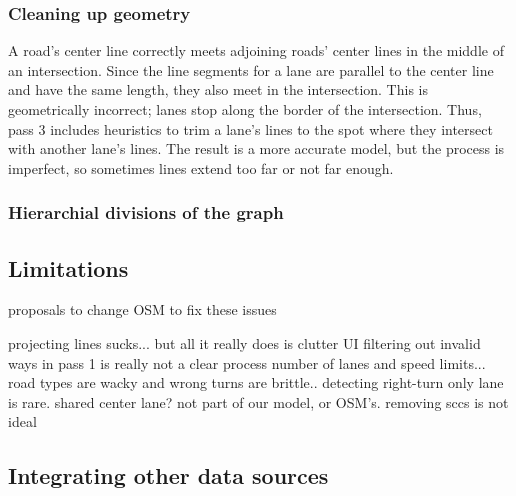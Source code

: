 \documentclass[letterpaper, 10 pt, conference]{ieeeconf}  %
\begin{document}
\subsubsection{Cleaning up geometry}

A road's center line correctly meets adjoining roads' center lines in the middle
of an intersection. Since the line segments for a lane are parallel to the center line
and have the same length, they also meet in the
intersection. This is
geometrically incorrect; lanes stop along the border of the intersection. Thus,
pass 3 includes heuristics to trim a lane's lines to the spot where they
intersect with another lane's lines. The result is a more accurate model, but
the process is imperfect, so sometimes lines extend too far or not far
enough.

\subsubsection{Hierarchial divisions of the graph}


\subsection{Limitations}

 

proposals to change OSM to fix these issues

projecting lines sucks... but all it really does is clutter UI
filtering out invalid ways in pass 1 is really not a clear process
number of lanes and speed limits... road types are wacky and wrong
turns are brittle.. detecting right-turn only lane is rare. shared center lane?
  not part of our model, or OSM's.
removing sccs is not ideal

\subsection{Integrating other data sources}
\end{document}
